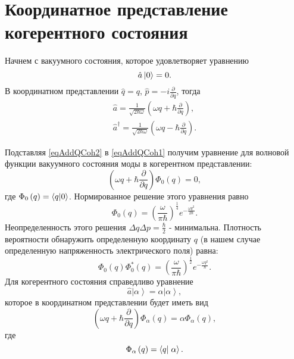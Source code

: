 \section{Координатное представление когерентного состояния}
\label{AddQCoh}
Начнем с вакуумного состояния, которое удовлетворяет уравнению 
\begin{equation}
\hat{a}\ket{0} = 0.
\label{eqAddQCoh1}
\end{equation}
В координатном представлении $\hat{q} = q$, $\hat{p} = -i
\frac{\partial}{\partial q}$, тогда
\begin{eqnarray}
\hat{a} = \frac{1}{\sqrt{2 \hbar \omega}}
\left(
\omega q + \hbar \frac{\partial}{\partial q}
\right),
\nonumber \\
\hat{a}^{\dag} = \frac{1}{\sqrt{2 \hbar \omega}}
\left(
\omega q - \hbar \frac{\partial}{\partial q}
\right).
\label{eqAddQCoh2}
\end{eqnarray}

Подставляя \eqref{eqAddQCoh2} в \eqref{eqAddQCoh1} получим уравнение
для волновой функции вакуумного состояния моды в когерентном
представлении:
\begin{equation}
\left(
\omega q + \hbar \frac{\partial}{\partial q}
\right) \Phi_0\left(q\right) = 0,
\label{eqAddQCoh3}
\end{equation}
где $\Phi_0\left(q\right) = \bra{q}\ket{0}$.
Нормированное решение этого уравнения равно
\begin{equation}
\Phi_0\left(q\right) = \left(\frac{\omega}{\pi
  \hbar}\right)^{\frac{1}{4}} e^{-\frac{\omega q^2}{2 \hbar}}.
\nonumber
\end{equation}
Неопределенность этого решения $\Delta q \Delta p =
\frac{\hbar}{2}$ - минимальна. Плотность вероятности обнаружить
определенную координату $q$ (в нашем случае определенную напряженность
электрического поля) равна:
\begin{equation}
\Phi_0\left(q\right)\Phi_0^{*}\left(q\right) = \left(\frac{\omega}{\pi
  \hbar}\right)^{\frac{1}{2}} e^{-\frac{\omega q^2}{\hbar}}.
\label{eqAddQCoh4}
\end{equation}
Для когерентного состояния справедливо уравнение
\[
\hat{a}\left|\alpha\right> = \alpha \left|\alpha\right>,
\]
которое в координатном представлении будет иметь вид
\begin{equation}
\left(
\omega q + \hbar \frac{\partial}{\partial q}
\right) \Phi_{\alpha}\left(q\right) = 
\alpha \Phi_{\alpha}\left(q\right),
\label{eqAddQCoh5}
\end{equation}
где 
\[
\Phi_{\alpha}\left(q\right) = \bra{q}\left.\alpha\right>.
\]


